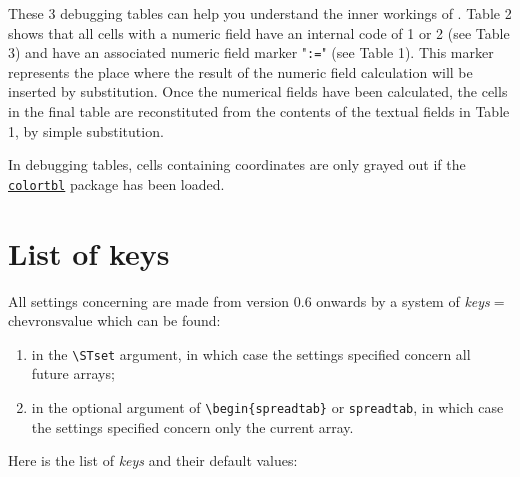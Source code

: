 \documentclass[english,a4paper,10pt]{article}
\newcommand*\ST{\textsf{\STname}\xspace}
\newcommand*\chevrons[1]{\textlangle\textit{#1}\textrangle}
\begin{document}
These 3 debugging tables can help you understand the inner workings of \ST. Table 2 shows that all cells with a numeric field have an internal code of 1 or 2 (see Table 3) and have an associated numeric field marker "\verb-:=-" (see Table 1). This marker represents the place where the result of the numeric field calculation will be inserted by substitution. Once the numerical fields have been calculated, the cells in the final table are reconstituted from the contents of the textual fields in Table 1, by simple substitution.

In debugging tables, cells containing coordinates are only grayed out if the \href{https://ctan.org/pkg/colortbl}{\texttt{colortbl}} package has been loaded.

\section{List of keys}\label{key/val}
All settings concerning \ST are made from version 0.6 onwards by a system of \chevrons{keys}$=$chevrons{value} which can be found:
\begin{enumerate}
	\item in the \verb|\STset| argument, in which case the settings specified concern all future arrays;
	\item in the optional argument of \verb|\begin{spreadtab}| or \verb|spreadtab|, in which case the settings specified concern only the current array.
\end{enumerate}
Here is the list of \chevrons{keys} and their default values:\renewcommand\arraystretch{1.33}%
\end{document}
